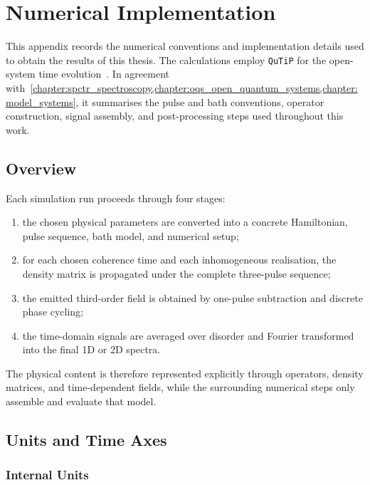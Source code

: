 \chapter{Numerical Implementation}
\label{app:numerical_implementation}

This appendix records the numerical conventions and implementation details
used to obtain the results of this thesis. The calculations employ
\texttt{QuTiP} for the open-system time
evolution~\cite{lambertetal2026qutip5quantum}. In agreement
with~\cref{chapter:spctr_spectroscopy,chapter:oqs_open_quantum_systems,chapter:model_systems},
it summarises the pulse and bath conventions, operator construction, signal
assembly, and post-processing steps used throughout this work.

\section{Overview}
\label{app:sec:software_architecture}

Each simulation run proceeds through four stages:
\begin{enumerate}
    \item the chosen physical parameters are converted into a concrete
    Hamiltonian, pulse sequence, bath model, and numerical setup;
    \item for each chosen coherence time and each inhomogeneous realisation,
    the density matrix is propagated under the complete three-pulse sequence;
    \item the emitted third-order field is obtained by one-pulse subtraction
    and discrete phase cycling;
    \item the time-domain signals are averaged over disorder and Fourier
    transformed into the final 1D or 2D spectra.
\end{enumerate}

The physical content is therefore represented explicitly through operators,
density matrices, and time-dependent fields, while the surrounding numerical
steps only assemble and evaluate that model.

\section{Units and Time Axes}
\label{app:sec:configuration_workflow}

\subsection{Internal Units}

